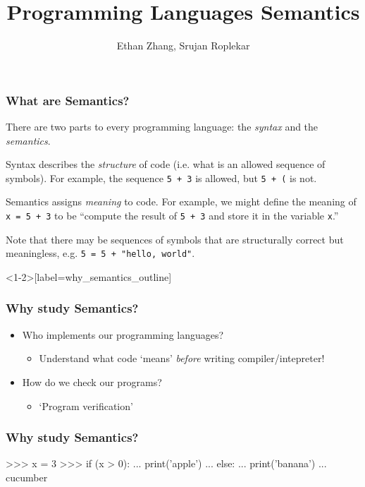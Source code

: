 \documentclass{beamer}
\title{Programming Languages Semantics}
\author{Ethan Zhang, Srujan Roplekar}
\institute[]{CS SAIL 2026}
\date{}
\begin{document}
\frame{\titlepage}


\begin{frame}
	\frametitle{What are Semantics?}

	There are two parts to every programming language: the \emph{syntax} and the \emph{semantics}.

	Syntax describes the \emph{structure} of code (i.e. what is an allowed sequence of symbols).
	For example, the sequence \texttt{5 + 3} is allowed, but \texttt{5 + (} is not.

	Semantics assigns \emph{meaning} to code.
	For example, we might define the meaning of \texttt{x = 5 + 3} to be ``compute the result of \texttt{5 + 3} and store it in the variable \texttt{x}.''

	Note that there may be sequences of symbols that are structurally correct but meaningless, e.g. \texttt{5 = 5 + "hello, world"}.
\end{frame}

\begin{frame}<1-2>[label=why_semantics_outline]
	\frametitle{Why study Semantics?}
	\begin{itemize}
		\item <1-> Who implements our programming languages?
		      \begin{itemize}
			      \item <2-> Understand what code `means' \textit{before} writing compiler/intepreter!
		      \end{itemize}
		      \vspace{2ex}
		\item <4-> How do we check our programs?
		      \begin{itemize}
			      \item <5-> `Program verification'
		      \end{itemize}
	\end{itemize}
\end{frame}

\begin{frame}[fragile]
	\frametitle{Why study Semantics?}
	\begin{semiverbatim}
		>>> x = 3
		>>> if (x > 0):
		...     print('apple')
		... else:
		...     print('banana')
		...\pause
		cucumber
	\end{semiverbatim}
\end{frame}
\end{document}
